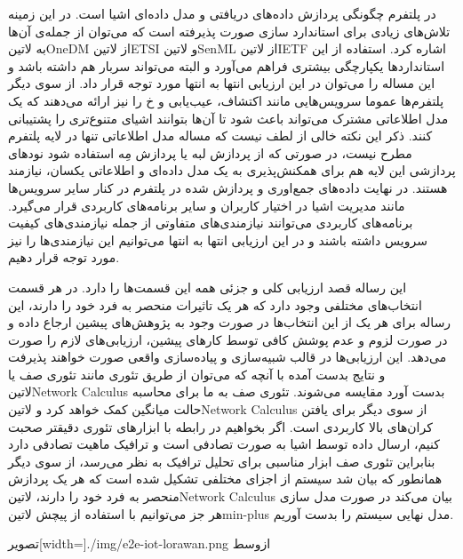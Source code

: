 در پلتفرم چگونگی پردازش داده‌های دریافتی و مدل داده‌ای اشیا است. در این زمینه تلاش‌های زیادی برای استاندارد سازی صورت پذیرفته است که می‌توان از
جمله‌ی آن‌ها به ‌لاتین{OneDM} از ‌لاتین{ETSI} و ‌لاتین{SenML} از ‌لاتین{IETF} اشاره کرد. استفاده از این استانداردها یکپارچگی
بیشتری فراهم می‌آورد و البته می‌تواند سربار هم داشته باشد و این مساله را می‌توان در این ارزیابی انتها به انتها مورد توجه قرار داد.
از سوی دیگر پلتفرم‌ها عموما سرویس‌هایی مانند اکتشاف، عیب‌یابی و ‌خ را نیز ارائه می‌دهند که یک مدل اطلاعاتی مشترک می‌تواند باعث شود تا آن‌ها
بتوانند اشیای متنوع‌تری را پشتیبانی کنند.
ذکر این نکته خالی از لطف نیست که مساله مدل اطلاعاتی تنها در لایه پلتفرم مطرح نیست، در صورتی که از پردازش لبه یا پردازش مِه استفاده شود نودهای پردازشی این لایه
هم برای همکنش‌پذیری به یک مدل داده‌ای و اطلاعاتی یکسان، نیازمند هستند.
در نهایت داده‌های جمع‌اوری و پردازش شده در پلتفرم در کنار سایر سرویس‌ها مانند مدیریت اشیا در اختیار کاربران و سایر برنامه‌های کاربردی قرار می‌گیرد.
برنامه‌های کاربردی می‌توانند نیازمندی‌های متفاوتی از جمله نیازمندی‌های کیفیت سرویس داشته باشند و در این ارزیابی انتها به انتها می‌توانیم این نیازمندی‌ها را
نیز مورد توجه قرار دهیم.

این رساله قصد ارزیابی کلی و جزئی همه این قسمت‌ها را دارد. در هر قسمت انتخاب‌های مختلفی وجود دارد که هر یک تاثیرات منحصر به فرد خود را دارند،
این رساله برای هر یک از این انتخاب‌ها در صورت وجود به پژوهش‌های پیشین ارجاع داده و در صورت لزوم و عدم پوشش کافی توسط کارهای پیشین، ارزیابی‌های لازم را صورت می‌دهد.
این ارزیابی‌ها در قالب شبیه‌سازی و پیاده‌سازی واقعی صورت خواهند پذیرفت و نتایج بدست آمده با آنچه که می‌توان از طریق تئوری مانند تئوری صف یا ‌لاتین{Network Calculus}
بدست آورد مقایسه می‌شوند. تئوری صف به ما برای محاسبه حالت میانگین کمک خواهد کرد و ‌لاتین{Network Calculus} از سوی دیگر برای یافتن کران‌های بالا کاربردی است.
اگر بخواهیم در رابطه با ابزارهای تئوری دقیقتر صحبت کنیم، ارسال داده توسط اشیا به صورت تصادفی است و ترافیک ماهیت تصادفی دارد بنابراین تئوری صف ابزار مناسبی برای تحلیل ترافیک به نظر می‌رسد،
از سوی دیگر همانطور که بیان شد سیستم از اجزای مختلفی تشکیل شده است که هر یک پردازش منحصر به فرد خود را دارند، ‌لاتین{Network Calculus} بیان می‌کند در صورت مدل سازی هر جز
می‌توانیم با استفاده از پیچش ‌لاتین{min-plus} مدل نهایی سیستم را بدست آوریم.

‌تصویر[width=\textwidth]{./img/e2e-iot-lorawan.png}
‌ازوسط


